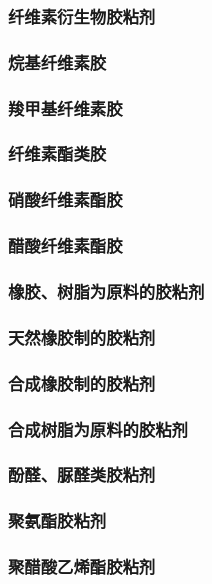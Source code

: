 \documentclass[UTF8]{../../ApplicationUniverse}
\begin{document}
    \subsubsection{纤维素衍生物胶粘剂}
        \subsubsection{烷基纤维素胶}
        \subsubsection{羧甲基纤维素胶}
        \subsubsection{纤维素酯类胶}
            \subsubsection{硝酸纤维素酯胶}
            \subsubsection{醋酸纤维素酯胶}
    \subsubsection{橡胶、树脂为原料的胶粘剂}
        \subsubsection{天然橡胶制的胶粘剂}
        \subsubsection{合成橡胶制的胶粘剂}
        \subsubsection{合成树脂为原料的胶粘剂}
            \subsubsection{酚醛、脲醛类胶粘剂}
            \subsubsection{聚氨酯胶粘剂}
            \subsubsection{聚醋酸乙烯酯胶粘剂}
\end{document}
